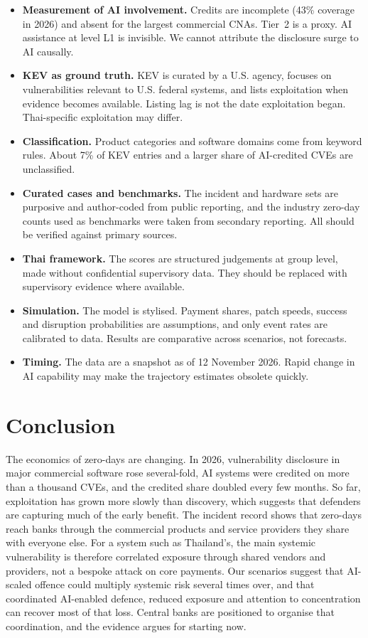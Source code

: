 \begin{itemize}
\item \textbf{Measurement of AI involvement.} Credits are incomplete (43\% coverage in 2026) and absent for the largest commercial CNAs. Tier~2 is a proxy. AI assistance at level L1 is invisible. We cannot attribute the disclosure surge to AI causally.
\item \textbf{KEV as ground truth.} KEV is curated by a U.S. agency, focuses on vulnerabilities relevant to U.S. federal systems, and lists exploitation when evidence becomes available. Listing lag is not the date exploitation began. Thai-specific exploitation may differ.
\item \textbf{Classification.} Product categories and software domains come from keyword rules. About 7\% of KEV entries and a larger share of AI-credited CVEs are unclassified.
\item \textbf{Curated cases and benchmarks.} The incident and hardware sets are purposive and author-coded from public reporting, and the industry zero-day counts used as benchmarks were taken from secondary reporting. All should be verified against primary sources.
\item \textbf{Thai framework.} The scores are structured judgements at group level, made without confidential supervisory data. They should be replaced with supervisory evidence where available.
\item \textbf{Simulation.} The model is stylised. Payment shares, patch speeds, success and disruption probabilities are assumptions, and only event rates are calibrated to data. Results are comparative across scenarios, not forecasts.
\item \textbf{Timing.} The data are a snapshot as of 12 November 2026. Rapid change in AI capability may make the trajectory estimates obsolete quickly.
\end{itemize}

\section{Conclusion}\label{sec:conclusion}

The economics of zero-days are changing. In 2026, vulnerability disclosure in major commercial software rose several-fold, AI systems were credited on more than a thousand CVEs, and the credited share doubled every few months. So far, exploitation has grown more slowly than discovery, which suggests that defenders are capturing much of the early benefit. The incident record shows that zero-days reach banks through the commercial products and service providers they share with everyone else. For a system such as Thailand's, the main systemic vulnerability is therefore correlated exposure through shared vendors and providers, not a bespoke attack on core payments. Our scenarios suggest that AI-scaled offence could multiply systemic risk several times over, and that coordinated AI-enabled defence, reduced exposure and attention to concentration can recover most of that loss. Central banks are positioned to organise that coordination, and the evidence argues for starting now.

